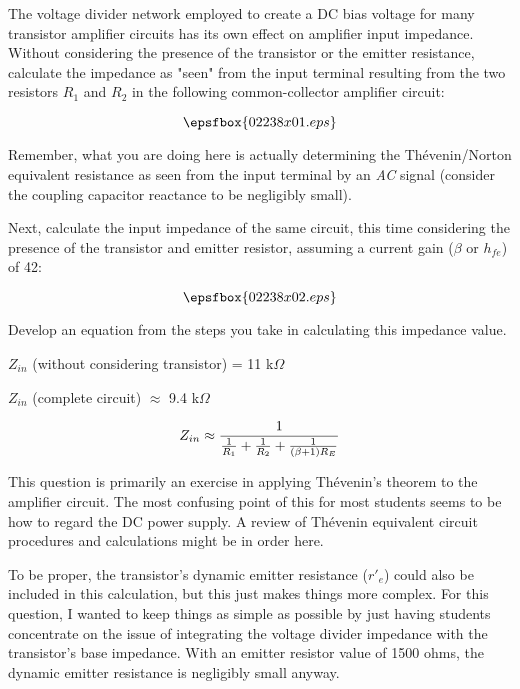 

The voltage divider network employed to create a DC bias voltage for many transistor amplifier circuits has its own effect on amplifier input impedance.  Without considering the presence of the transistor or the emitter resistance, calculate the impedance as "seen" from the input terminal resulting from the two resistors $R_1$ and $R_2$ in the following common-collector amplifier circuit:

$$\epsfbox{02238x01.eps}$$

Remember, what you are doing here is actually determining the Th\'evenin/Norton equivalent resistance as seen from the input terminal by an {\it AC} signal (consider the coupling capacitor reactance to be negligibly small).

\vskip 10pt

Next, calculate the input impedance of the same circuit, this time considering the presence of the transistor and emitter resistor, assuming a current gain ($\beta$ or $h_{fe}$) of 42:

$$\epsfbox{02238x02.eps}$$

Develop an equation from the steps you take in calculating this impedance value.







$Z_{in}$ (without considering transistor) = 11 k$\Omega$

\vskip 10pt

$Z_{in}$ (complete circuit) $\approx$ 9.4 k$\Omega$

$$Z_{in} \approx {1 \over {{1 \over R_1} + {1 \over R_2} + {1 \over (\beta + 1) R_E}}}$$







This question is primarily an exercise in applying Th\'evenin's theorem to the amplifier circuit.  The most confusing point of this for most students seems to be how to regard the DC power supply.  A review of Th\'evenin equivalent circuit procedures and calculations might be in order here.

To be proper, the transistor's dynamic emitter resistance ($r'_e$) could also be included in this calculation, but this just makes things more complex.  For this question, I wanted to keep things as simple as possible by just having students concentrate on the issue of integrating the voltage divider impedance with the transistor's base impedance.  With an emitter resistor value of 1500 ohms, the dynamic emitter resistance is negligibly small anyway.




